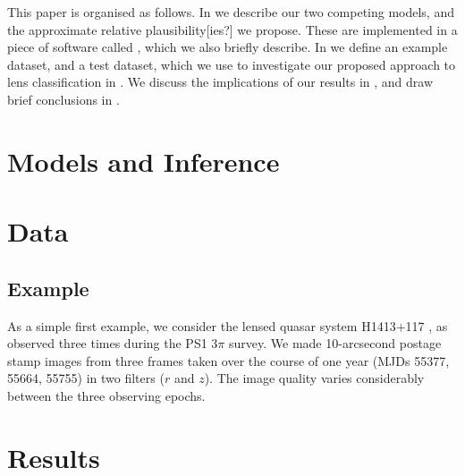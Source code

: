 \documentclass[useAMS,usenatbib]{mn2e}
\begin{document}
This paper is organised as follows. In  we describe our two
competing models, and the approximate relative plausibility[ies?] we
propose. These are implemented in a piece of software called \LT, which we
also briefly describe. In  we define an example dataset,
and a test dataset, which we use to investigate our proposed approach to
lens classification in . We discuss the implications of
our results in , and draw brief conclusions in
.



\section{Models and Inference}
\label{sec:model}



\section{Data}
\label{sed:data}

\subsection{Example}
\label{sec:data:example}

As a simple first example, we consider the lensed quasar system H1413$+$117
\citep{H1413}, as observed three times during the PS1 $3\pi$ survey. We 
made 10-arcsecond postage stamp images from three frames taken over the
course of one year (MJDs  55377, 55664, 55755) in two filters ($r$ and
$z$). The image quality varies considerably between the three observing
epochs.




\section{Results}
\label{sec:results}
\end{document}

